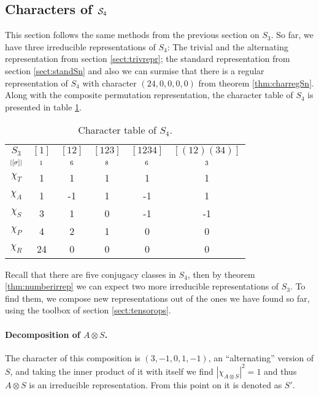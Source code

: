 \subsection{Characters of $\mathcal{S}_4$}

This section follows the same methods from the previous section on $S_3$. So far, we have three irreducible representations of $S_4$: The trivial and the alternating representation from section \ref{sect:trivrepr}; the standard representation from section \ref{sect:standSn} and also we can surmise that there is a regular representation of $S_4$ with character $(24,0,0,0,0)$ from theorem \ref{thm:charregSn}. Along with the composite permutation representation, the character table of $S_4$ is presented in table \ref{table:charS4}. 

\begin{table}[hbt!]
	\centering
	\begin{tabular}{c | c c c c c}
		$S_3$      & $[1]$   & $[12]$  & $[123]$ & $[1234]$ & $[(12)(34)]$ \\
		$\scriptstyle|[\sigma]|$ & $\scriptstyle 1$ & $\scriptstyle 6$ & $\scriptstyle 8$ & $\scriptstyle 6$  & $\scriptstyle 3$      \\ \hline
		$\chi_T$     & 1       & 1       & 1       & 1        & 1            \\
		$\chi_A$     & 1       & -1      & 1       & -1       & 1            \\
		$\chi_S$     & 3       & 1       & 0       & -1       & -1           \\ \hline\hline
		$\chi_P$     & 4       & 2       & 1       & 0        & 0            \\
		$\chi_R$     & 24      & 0       & 0       & 0        & 0            	\end{tabular}
	\caption{Character table of $S_4$.}
	\label{table:charS4}
\end{table}

Recall that there are five conjugacy classes in $S_4$, then by theorem \ref{thm:numberirrep} we can expect two more irreducible representations of $S_3$. To find them, we compose new representations out of the ones we have found so far, using the toolbox of section \ref{sect:tensorops}.

\paragraph{Decomposition of $A \otimes S$.} The character of this composition is $(3,-1,0,1,-1)$, an ``alternating'' version of $S$, and taking the inner product of it with itself we find $|\chi_{A \otimes S}|^2 = 1$ and thus $A \otimes S$ is an irreducible representation. From this point on it is denoted as $S'$.

